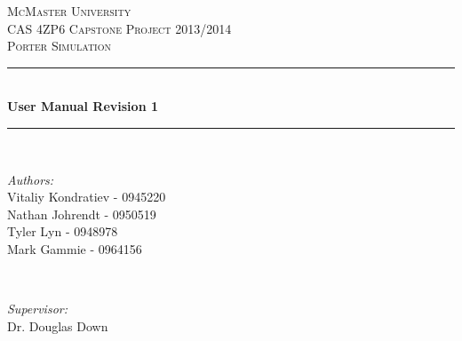 \documentclass[paper=letter, fontsize=10pt]{scrartcl}
\numberwithin{equation}{section}		%
\numberwithin{figure}{section}			%
\numberwithin{table}{section}				%
\begin{document}
\begin{titlepage}

\newcommand{\HRule}{\rule{\linewidth}{0.5mm}} %

\begin{center}
 

\textsc{\LARGE McMaster University}\\[1.5cm] %
\textsc{\Large CAS 4ZP6 Capstone Project 2013/2014}\\[0.5cm] %
\textsc{\large Porter Simulation}\\[0.5cm] %


\HRule \\[0.4cm]
{ \huge \bfseries User Manual Revision 1}\\[0.4cm] %
\HRule \\[1.5cm]
 

\begin{minipage}{0.4\textwidth}
\begin{flushleft} \large
\emph{Authors:}\\
Vitaliy Kondratiev - 0945220\\
Nathan Johrendt - 0950519\\
Tyler Lyn - 0948978\\
Mark Gammie - 0964156
\end{flushleft}
\end{minipage}
~
\begin{minipage}{0.4\textwidth}
\begin{flushright} \large
\emph{Supervisor:} \\
Dr. Douglas Down %
\end{flushright}
\end{minipage}\\[4cm]


\end{center}
\end{titlepage}
\end{document}
